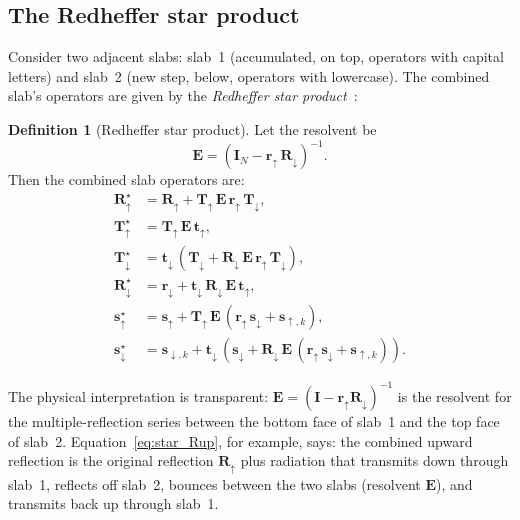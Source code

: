 \documentclass[11pt,a4paper]{article}
\newcommand{\vect}[1]{\bm{#1}}
\newcommand{\mat}[1]{\mathbf{#1}}
\theoremstyle{definition}
\newtheorem{definition}{Definition}
\begin{document}
\subsection{The Redheffer star product}

Consider two adjacent slabs: slab~1 (accumulated, on top, operators
with capital letters) and slab~2 (new step, below, operators with
lowercase).  The combined slab's operators are given by the
\emph{Redheffer star product}~\cite{redheffer1962}:

\begin{definition}[Redheffer star product]\label{def:star_product}
Let the resolvent be
\begin{equation}\label{eq:resolvent}
  \mat{E} = (\mat{I}_N - \mat{r}_\uparrow\,\mat{R}_\downarrow)^{-1}.
\end{equation}
Then the combined slab operators are:
\begin{align}
  \mat{R}_\uparrow^{\star}
    &= \mat{R}_\uparrow
     + \mat{T}_\uparrow\,\mat{E}\,\mat{r}_\uparrow\,\mat{T}_\downarrow,
  \label{eq:star_Rup}\\
  \mat{T}_\uparrow^{\star}
    &= \mat{T}_\uparrow\,\mat{E}\,\mat{t}_\uparrow,
  \label{eq:star_Tup}\\
  \mat{T}_\downarrow^{\star}
    &= \mat{t}_\downarrow\,(\mat{T}_\downarrow
     + \mat{R}_\downarrow\,\mat{E}\,\mat{r}_\uparrow\,\mat{T}_\downarrow),
  \label{eq:star_Tdn}\\
  \mat{R}_\downarrow^{\star}
    &= \mat{r}_\downarrow
     + \mat{t}_\downarrow\,\mat{R}_\downarrow\,\mat{E}\,\mat{t}_\uparrow,
  \label{eq:star_Rdn}\\
  \vect{s}_\uparrow^{\star}
    &= \vect{s}_\uparrow
     + \mat{T}_\uparrow\,\mat{E}\,
       (\mat{r}_\uparrow\,\vect{s}_\downarrow + \vect{s}_{\uparrow,k}),
  \label{eq:star_sup}\\
  \vect{s}_\downarrow^{\star}
    &= \vect{s}_{\downarrow,k}
     + \mat{t}_\downarrow\,
       (\vect{s}_\downarrow + \mat{R}_\downarrow\,\mat{E}\,
        (\mat{r}_\uparrow\,\vect{s}_\downarrow + \vect{s}_{\uparrow,k})).
  \label{eq:star_sdn}
\end{align}
\end{definition}

The physical interpretation is transparent:
$\mat{E}=(\mat{I}-\mat{r}_\uparrow\mat{R}_\downarrow)^{-1}$
is the resolvent for the multiple-reflection series between the
bottom face of slab~1 and the top face of slab~2.
Equation~\eqref{eq:star_Rup}, for example, says: the combined
upward reflection is the original reflection $\mat{R}_\uparrow$
plus radiation that transmits down through slab~1, reflects off
slab~2, bounces between the two slabs (resolvent $\mat{E}$), and
transmits back up through slab~1.
\end{document}
